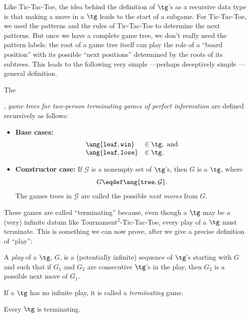 \begin{definition}
Like Tic-Tac-Toe, the idea behind the definition of $\tg$'s as a recursive
data type is that making a move in a $\tg$ leads to the start of a subgame.
For Tic-Tac-Toe, we used the patterns and the rules of Tic-Tac-Toe to
determine the next patterns.  But once we have a complete game tree, we
don't really need the pattern labels: the root of a game tree itself can
play the role of a ``board position'' with its possible ``next positions''
determined by the roots of its subtrees.  This leads to the following very
simple ---perhaps deceptively simple ---general definition.

\begin{definition}
The , \emph{game trees for two-person terminating
    games of perfect information} are defined recursively as follows:
\begin{itemize}

\item \textbf{Base cases:}
\[\begin{array}{ll}
\ang{\texttt{leaf},\texttt{win}} & \in \tg, \text{ and}\\
\ang{\texttt{leaf},\texttt{lose}}& \in \tg.
\end{array}\]

\item \textbf{Constructor case:}
If $\mathcal{G}$ is a nonempty set of
$\tg$'s, then $G$ is a $\tg$, where
\[
G \eqdef \ang{\texttt{tree},\mathcal{G}}.
\]
The games trees in $\mathcal{G}$ are called the possible \emph{next moves}
from $G$.
\end{itemize}

\end{definition}

These games are called ``terminating'' because, even though a $\tg$ may be
a (very) infinite datum like Tournament$^2$-Tic-Tac-Toe, every play of a
$\tg$ must terminate.  This is something we can now prove, after we give a
precise definition of ``play'':

\begin{definition}
A \emph{play} of a $\tg$, $G$, is a (potentially infinite) sequence of
$\tg$'s starting with $G$ and such that if $G_1$ and $G_2$ are consecutive
$\tg$'s in the play, then $G_2$ is a possible next move of $G_1$.

If a $\tg$ has no infinite play, it is called a \emph{terminating} game.
\end{definition}

\begin{theorem}
Every $\tg$ is terminating.
\end{theorem}


\end{definition}
